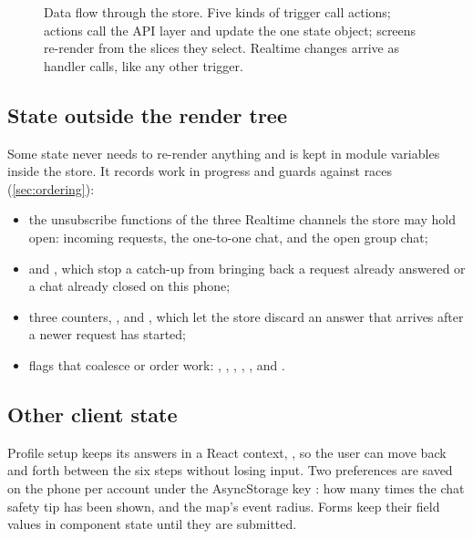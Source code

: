 \begin{figure}[ht]
  \centering
  
  \caption{Data flow through the store. Five kinds of trigger call actions; actions call the API layer and
    update the one state object; screens re-render from the slices they select. Realtime changes arrive
    as handler calls, like any other trigger.}
  \label{fig:store-flow}
\end{figure}

\subsection{State outside the render tree}

Some state never needs to re-render anything and is kept in module variables inside the store. It
records work in progress and guards against races (\cref{sec:ordering}):

\begin{itemize}
  \item the unsubscribe functions of the three Realtime channels the store may hold open: incoming
    requests, the one-to-one chat, and the open group chat;
  \item {} and , which stop a catch-up from bringing back a
    request already answered or a chat already closed on this phone;
  \item three counters, ,  and , which let
    the store discard an answer that arrives after a newer request has started;
  \item flags that coalesce or order work: , ,
    , , ,  and
    .
\end{itemize}

\subsection{Other client state}

Profile setup keeps its answers in a React context, , so the user can move
back and forth between the six steps without losing input. Two preferences are saved on the phone per
account under the AsyncStorage key : how many times the chat safety tip has
been shown, and the map's event radius. Forms keep their field values in component state until they
are submitted.

